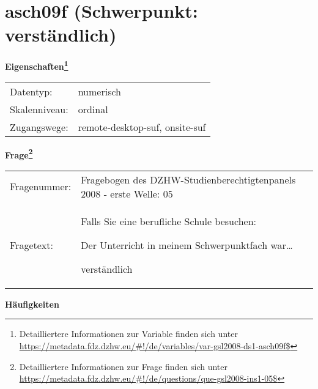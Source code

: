 
    \setcounter{footnote}{0}

    \vspace*{-1.8cm}
	\section{asch09f (Schwerpunkt: verständlich)}
	\label{section:asch09f}



    \vspace*{0.5cm}
    \noindent\textbf{Eigenschaften\footnote{Detailliertere Informationen zur Variable finden sich unter
		\url{https://metadata.fdz.dzhw.eu/\#!/de/variables/var-gsl2008-ds1-asch09f$}}}\\
	\begin{tabularx}{\hsize}{@{}lX}
	Datentyp: & numerisch \\
	Skalenniveau: & ordinal \\
	Zugangswege: &
	  remote-desktop-suf, 
	  onsite-suf
 \\
    \end{tabularx}



				\vspace*{0.5cm}
                \noindent\textbf{Frage\footnote{Detailliertere Informationen zur Frage finden sich unter
		              \url{https://metadata.fdz.dzhw.eu/\#!/de/questions/que-gsl2008-ins1-05$}}}\\
				\begin{tabularx}{\hsize}{@{}lX}
					Fragenummer: &
					  Fragebogen des DZHW-Studienberechtigtenpanels 2008 - erste Welle:
					  05
 \\
					Fragetext: & Falls Sie eine berufliche Schule besuchen:\par  Der Unterricht in meinem Schwerpunktfach war…\par  verständlich \\
				\end{tabularx}





        		\vspace*{0.5cm}
                \noindent\textbf{Häufigkeiten}

